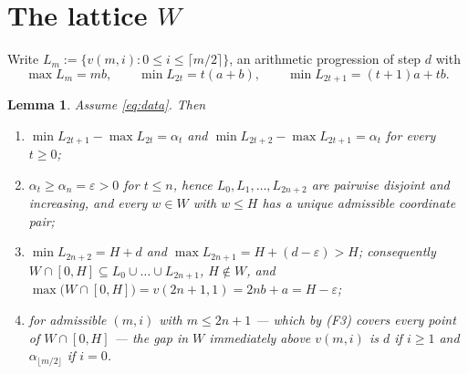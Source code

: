 \documentclass[11pt]{amsart}
\newtheorem{lemma}[theorem]{Lemma}
\theoremstyle{definition}
\theoremstyle{remark}
\begin{document}
\section{The lattice $W$}

Write $L_m:=\{v(m,i):0\le i\le\lceil m/2\rceil\}$, an arithmetic progression of
step $d$ with
\[
  \max L_m=mb,\qquad
  \min L_{2t}=t(a+b),\qquad
  \min L_{2t+1}=(t+1)a+tb .
\]

\begin{lemma}\label{lem:lattice}
Assume \eqref{eq:data}. Then
\begin{enumerate}
\item[\textup{(F1)}]
  $\min L_{2t+1}-\max L_{2t}=\alpha_t$ and
  $\min L_{2t+2}-\max L_{2t+1}=\alpha_t$ for every $t\ge0$;
\item[\textup{(F2)}]
  $\alpha_t\ge\alpha_n=\varepsilon>0$ for $t\le n$, hence
  $L_0,L_1,\dots,L_{2n+2}$ are pairwise disjoint and increasing, and every
  $w\in W$ with $w\le H$ has a \emph{unique} admissible coordinate pair;
\item[\textup{(F3)}]
  $\min L_{2n+2}=H+d$ and $\max L_{2n+1}=H+(d-\varepsilon)>H$; consequently
  $W\cap[0,H]\subseteq L_0\cup\dots\cup L_{2n+1}$, $H\notin W$, and
  $\max\bigl(W\cap[0,H]\bigr)=v(2n+1,1)=2nb+a=H-\varepsilon$;
\item[\textup{(F4)}]
  for admissible $(m,i)$ with $m\le2n+1$ --- which by \textup{(F3)} covers every
  point of $W\cap[0,H]$ --- the gap in $W$ immediately above $v(m,i)$ is $d$ if
  $i\ge1$ and $\alpha_{\lfloor m/2\rfloor}$ if $i=0$.
\end{enumerate}
\end{lemma}
\end{document}
